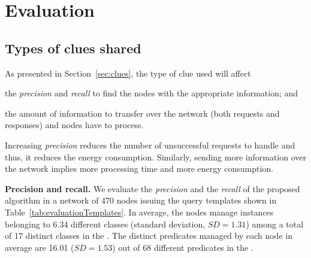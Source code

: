 \section{Evaluation}
\label{sec:search_evaluation}

\subsection{Types of clues shared}
\label{sec:clues_eval}
As presented in Section~\ref{sec:clues}, the type of clue used will affect
\begin{enumerate*}[label=\itshape(\arabic*\upshape)]
  \item the \emph{precision} and \emph{recall} to find the nodes with the appropriate information; and %
  \item the amount of information to transfer over the network (both requests and responses) and nodes have to process.
\end{enumerate*}
Increasing \emph{precision} reduces the number of unsuccessful requests to handle and thus, it reduces the energy consumption. 
Similarly, sending more information over the network implies more processing time and more energy consumption.

\medskip

\noindent\textbf{Precision and recall.}
We evaluate the \emph{precision} and the \emph{recall} of the proposed algorithm in a network of 470 nodes issuing the query templates shown in Table~\ref{tab:evaluationTemplates}.
In average, the nodes manage instances belonging to 6.34 different classes (standard deviation, $SD=1.31$) among a total of 17 distinct classes in the \Space{}.
The distinct predicates managed by each node in average are 16.01 ($SD=1.53$) out of 68 different predicates in the \Space{}.


\newcommand{\tplone}{\emph{T1}}
\newcommand{\tpltwo}{\emph{T2}}
\newcommand{\tplthree}{\emph{T3}}
\newcommand{\tplfour}{\emph{T4}}
\newcommand{\tplfive}{\emph{T5}}





